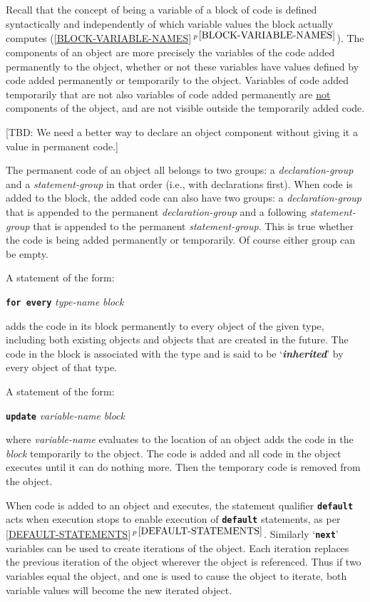 \documentclass[12pt]{article}
\makeatletter
\newcommand{\TT}[1]{{\tt \bfseries #1}}
\newcommand{\skey}[2]{{\bf \em #1#2}\index{#1}}
\newcommand{\ttkey}[1]{\TT{#1}\index{#1@{\tt #1}}}
\newcommand{\secref}[1]{\ref{#1}$\,^{p\,\pageref{#1}}$}
\newenvironment{indpar}[1][0.3in]%
	{\begin{list}{}%
		     {\setlength{\itemsep}{0in}%
		      \setlength{\topsep}{0in}%
		      \setlength{\parsep}{1ex}%
		      \setlength{\labelwidth}{#1}%
		      \setlength{\leftmargin}{#1}%
		      \addtolength{\leftmargin}{\labelsep}}%
	 \item}%
	{\end{list}}
\makeatother
\begin{document}
Recall that the concept of being a variable of a block
of code is defined syntactically and independently of which variable values
the block actually computes (\secref{BLOCK-VARIABLE-NAMES}).
The components of an object are more precisely the variables
of the code added permanently to the object, whether or not these
variables have values defined by code added permanently or temporarily
to the object.  Variables of code added temporarily that are not
also variables of code added permanently are
\underline{not} components of the object,
and are not visible outside the temporarily added code.

[TBD: We need a better way to declare an object component
without giving it a value in permanent code.]

The permanent code of an object all belongs to two groups: a
{\em declaration-group} and a {\em statement-group} in that
order (i.e., with declarations first).
When code is added to the block, the added code can also
have two groups: a {\em declaration-group} that is appended to the
permanent {\em declaration-group} and a following {\em statement-group} that
is appended to the permanent {\em statement-group}.  This is true whether
the code is being added permanently or temporarily.  Of course either
group can be empty.

A statement of the form:

\begin{indpar}
\ttkey{for every} {\em type-name} {\em block} 
\end{indpar}

adds the code in its block permanently to every object of the given type,
including both existing objects and objects that are
created in the future.  The code in the block is associated with the
type and is said to be `\skey{inherit}{ed}' by every object of that type.

A statement of the form:

\begin{indpar}
\ttkey{update} {\em variable-name} {\em block} 
\end{indpar}\label{UPDATE}

where {\em variable-name} evaluates to the location of an
object adds the code in the
{\em block} temporarily to the object.  The code is added and all
code in the object executes until it can do nothing more.  Then
the temporary code is removed from the object.

When code is added to an object and executes, the statement qualifier
\TT{default} acts when execution stops to enable execution of \TT{default}
statements, as per \secref{DEFAULT-STATEMENTS}.  Similarly
`\TT{next}' variables can be used to create iterations of the
object.  Each iteration replaces the previous iteration of the object
wherever the object is referenced.  Thus if two variables equal
the object, and one is used to cause the object to iterate, both variable
values will become the new iterated object.
\end{document}
